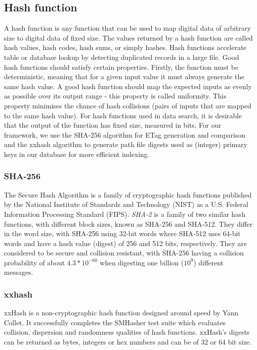   \subsection{Hash function}
    A hash function is any function that can be used to map digital data of arbitrary size to digital data of fixed size. The values returned by a hash function are called hash values, hash codes, hash sums, or simply hashes. Hash functions accelerate table or database lookup by detecting duplicated records in a large file. Good hash functions should satisfy certain properties. Firstly, the function must be deterministic, meaning that for a given input value it must always generate the same hash value. A good hash function should map the expected inputs as evenly as possible over its output range - this property is called uniformity. This property minimises the chance of hash collisions (pairs of inputs that are mapped to the same hash value). For hash functions used in data search, it is desirable that the output of the function has fixed size, measured in bits. For our framework, we use the SHA-256 algorithm for ETag generation and comparison and the xxhash algorithm to generate path file digests used as (integer) primary keys in our database for more efficient indexing.

    \subsubsection{SHA-256}
    The Secure Hash Algorithm is a family of cryptographic hash functions published by the National Institute of Standards and Technology (NIST) as a U.S. Federal Information Processing Standard (FIPS). \emph{SHA-2} is a family of two similar hash functions, with different block sizes, known as SHA-256 and SHA-512. They differ in the word size, with SHA-256 using 32-bit words where SHA-512 uses 64-bit words and have a hash value (digest) of 256 and 512 bits, respectively. They are considered to be secure and collision resistant, with SHA-256 having a collision probability of about $4.3*10^{-60}$ when digesting one billion ($10^9$) different messages.

    \subsubsection{xxhash}
    xxHash\cite{xxhash-src} is a non-cryptographic hash function designed around speed by Yann Collet. It successfully completes the SMHasher test suite which evaluates collision, dispersion and randomness qualities of hash functions. xxHash's digests can be returned as bytes, integers or hex numbers and can be of 32 or 64 bit size.

